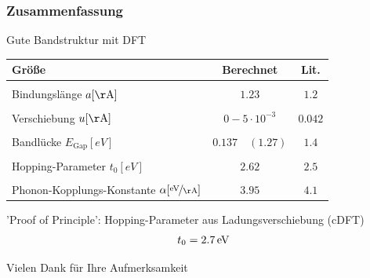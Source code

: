 \begin{frame}
\frametitle{Zusammenfassung}
Gute Bandstruktur mit DFT
\begin{table}[!h]
	\centering
	\begin{tabular}{l|c|c}
		Größe & Berechnet & Lit.\\
		\hline \hline
		&&\\[-.3cm]
		Bindungslänge \hfill$a [\unit{\AA}]$ & $1.23$ & $1.2$\\ \hline&&\\[-.3cm]
		Verschiebung \hfill$u [\unit{\AA}]$& $0 - 5\cdot10^{-3}$ & $0.042$\\ \hline&&\\[-.3cm]
		Bandlücke \hfill$E_\text{Gap} [\unit{eV}]$ & $0.137\quad(1.27)$ & $1.4$\\ \hline &&\\[-.3cm]
		Hopping-Parameter \hfill$t_0 [\unit{eV}]$ & $2.62$ & $2.5$ \\ \hline&&\\[-.3cm]
		Phonon-Kopplungs-Konstante \hspace*{.5cm}$\alpha [\unitfrac{eV}{\AA}]$& $3.95$ & $4.1$
	\end{tabular}
\end{table}
'Proof of Principle': Hopping-Parameter aus Ladungsverschiebung (cDFT)\\
\begin{align*}
t_0 = \unit[2.7]{eV}
\end{align*}
\end{frame}

\begin{frame}
\centering
\begin{huge}
Vielen Dank für Ihre Aufmerksamkeit
\end{huge}

\end{frame}